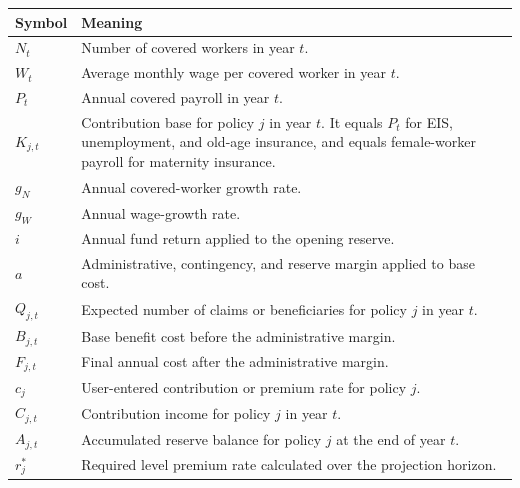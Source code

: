 \begin{longtable}{>{\raggedright\arraybackslash}p{} p{}}
\toprule
\textbf{Symbol} & \textbf{Meaning} \\
\midrule
$N_t$ & Number of covered workers in year $t$. \\
$W_t$ & Average monthly wage per covered worker in year $t$. \\
$P_t$ & Annual covered payroll in year $t$. \\
$K_{j,t}$ & Contribution base for policy $j$ in year $t$. It equals $P_t$ for EIS, unemployment, and old-age insurance, and equals female-worker payroll for maternity insurance. \\
$g_N$ & Annual covered-worker growth rate. \\
$g_W$ & Annual wage-growth rate. \\
$i$ & Annual fund return applied to the opening reserve. \\
$a$ & Administrative, contingency, and reserve margin applied to base cost. \\
$Q_{j,t}$ & Expected number of claims or beneficiaries for policy $j$ in year $t$. \\
$B_{j,t}$ & Base benefit cost before the administrative margin. \\
$F_{j,t}$ & Final annual cost after the administrative margin. \\
$c_j$ & User-entered contribution or premium rate for policy $j$. \\
$C_{j,t}$ & Contribution income for policy $j$ in year $t$. \\
$A_{j,t}$ & Accumulated reserve balance for policy $j$ at the end of year $t$. \\
$r_j^{\ast}$ & Required level premium rate calculated over the projection horizon. \\
\bottomrule
\end{longtable}
